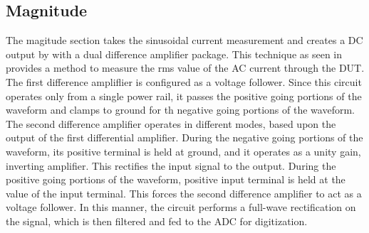 \subsection{Magnitude}

The magitude section takes the sinusoidal current measurement and creates a DC output by with a dual difference amplifier package. This technique as seen in \cite{absCircuit} provides a method to measure the rms value of the AC current through the DUT. The first difference ampliflier is configured as a voltage follower. Since this circuit operates only from a single power rail, it passes the positive going portions of the waveform and clamps to ground for th negative going portions of the waveform. The second difference amplifier operates in different modes, based upon the output of the first differential amplifier. During the negative going portions of the waveform, its positive terminal is held at ground, and it operates as a unity gain, inverting amplifier. This rectifies the input signal to the output. During the positive going portions of the waveform, positive input terminal is held at the value of the input terminal. This forces the second difference amplifier to act as a voltage follower. In this manner, the circuit performs a full-wave rectification on the signal, which is then filtered and fed to the ADC for digitization.
